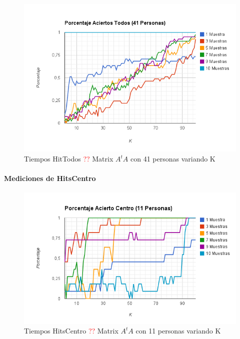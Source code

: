 \begin{figure}[H]
\includegraphics[width=1\textwidth]{img/imagel.png}
     \caption{Tiempos HitTodos \textcolor{red}{??} Matrix $A^tA$ con 41 personas variando K}
     \label{fig:figura1}
\end{figure}

\paragraph{Mediciones de HitsCentro}

\begin{figure}[H]
\includegraphics[width=1\textwidth]{img/imagem.png}
     \caption{Tiempos HitsCentro \textcolor{red}{??} Matrix $A^tA$ con 11 personas variando K}
     \label{fig:figura1}
\end{figure}

